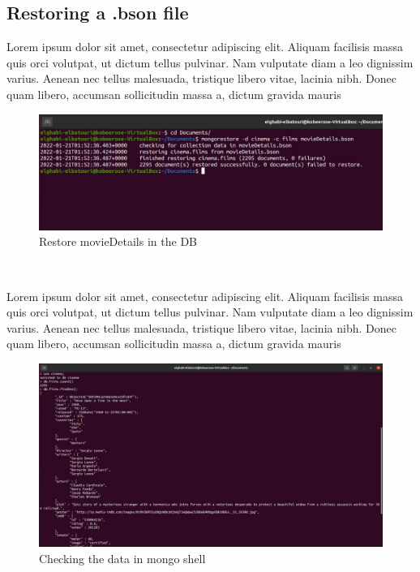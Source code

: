 \begin{spacing}{1.2}
\section{Restoring a .bson file }
\par Lorem ipsum dolor sit amet, consectetur adipiscing elit. Aliquam facilisis massa quis orci volutpat, ut dictum tellus pulvinar. Nam vulputate diam a leo dignissim varius. Aenean nec tellus malesuada, tristique libero vitae, lacinia nibh. Donec quam libero, accumsan sollicitudin massa a, dictum gravida mauris
\\
\begin{figure}[!htb] 
\begin{center} 
\includegraphics[width=1\linewidth]{Pictures/MongoDB/Examining MongoDB Query Features/Restoring a .bson file/Restore movieDetails in the DB} 
\end{center} 
\caption{Restore movieDetails in the DB} 
\end{figure}  \FloatBarrier
\\

\par Lorem ipsum dolor sit amet, consectetur adipiscing elit. Aliquam facilisis massa quis orci volutpat, ut dictum tellus pulvinar. Nam vulputate diam a leo dignissim varius. Aenean nec tellus malesuada, tristique libero vitae, lacinia nibh. Donec quam libero, accumsan sollicitudin massa a, dictum gravida mauris
\\
\begin{figure}[!htb] 
\begin{center} 
\includegraphics[width=1\linewidth]{Pictures/MongoDB/Examining MongoDB Query Features/Restoring a .bson file/Checking the data in mongo shell} 
\end{center} 
\caption{Checking the data in mongo shell} 
\end{figure}  \FloatBarrier
\\

\end{spacing}